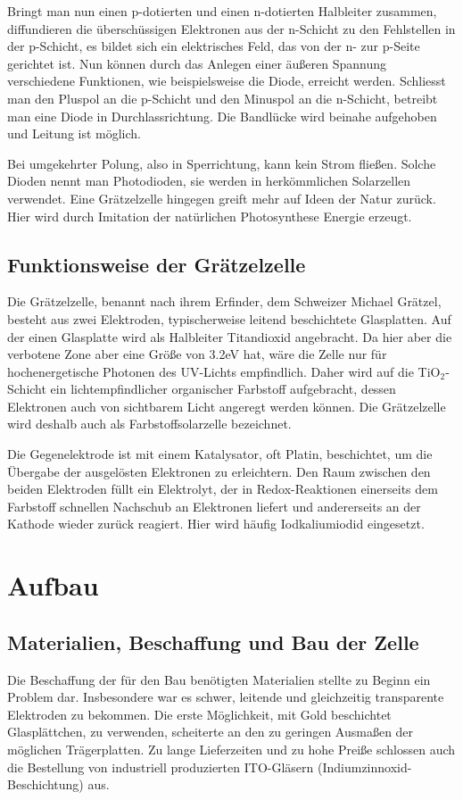 \documentclass[11pt]{scrartcl}
\begin{document}
Bringt man nun einen p-dotierten und einen n-dotierten Halbleiter zusammen, diffundieren die \"ubersch\"ussigen Elektronen aus der n-Schicht zu den Fehlstellen in der p-Schicht, es bildet sich ein elektrisches Feld, das von der n- zur p-Seite gerichtet ist. Nun k\"onnen durch das Anlegen einer \"au\ss{}eren Spannung verschiedene Funktionen, wie beispielsweise die Diode, erreicht werden. Schliesst man den Pluspol an die p-Schicht und den Minuspol an die n-Schicht, betreibt man eine Diode in Durchlassrichtung. Die Bandl\"ucke wird beinahe aufgehoben und Leitung ist m\"oglich.

Bei umgekehrter Polung, also in Sperrichtung, kann kein Strom flie\ss{}en. Solche Dioden nennt man Photodioden, sie werden in herk\"ommlichen Solarzellen verwendet. Eine Gr\"atzelzelle hingegen greift mehr auf Ideen der Natur zur\"uck. Hier wird durch Imitation der nat\"urlichen Photosynthese Energie erzeugt.



\subsection{Funktionsweise der Gr\"atzelzelle}
Die Gr\"atzelzelle, benannt nach ihrem Erfinder, dem Schweizer Michael Gr\"atzel, besteht aus zwei Elektroden, typischerweise leitend beschichtete Glasplatten. Auf der einen Glasplatte wird als Halbleiter Titandioxid angebracht. Da hier aber die verbotene Zone aber eine Gr\"o\ss{}e von 3.2eV hat, w\"are die Zelle nur f\"ur hochenergetische Photonen des UV-Lichts empfindlich. Daher wird auf die TiO$_{2}$-Schicht ein lichtempfindlicher organischer Farbstoff aufgebracht, dessen Elektronen auch von sichtbarem Licht angeregt werden k\"onnen. Die Gr\"atzelzelle wird deshalb auch als Farbstoffsolarzelle bezeichnet.

Die Gegenelektrode ist mit einem Katalysator, oft Platin, beschichtet, um die \"Ubergabe der ausgel\"osten Elektronen zu erleichtern. Den Raum zwischen den beiden Elektroden f\"ullt ein Elektrolyt, der in Redox-Reaktionen einerseits dem Farbstoff schnellen Nachschub an Elektronen liefert und andererseits an der Kathode wieder zur\"uck reagiert. Hier wird h\"aufig Iodkaliumiodid eingesetzt.





\section{Aufbau}
\subsection{Materialien, Beschaffung und Bau der Zelle}
Die Beschaffung der f\"ur den Bau ben\"otigten Materialien stellte zu Beginn ein Problem dar. Insbesondere war es schwer, leitende und gleichzeitig transparente Elektroden zu bekommen. Die erste M\"oglichkeit, mit Gold beschichtet Glaspl\"attchen, zu verwenden, scheiterte an den zu geringen Ausma\ss{}en der m\"oglichen Tr\"agerplatten. Zu lange Lieferzeiten und zu hohe Prei\ss{}e schlossen auch die Bestellung von industriell produzierten ITO-Gl\"asern (Indiumzinnoxid-Beschichtung) aus.
\end{document}
